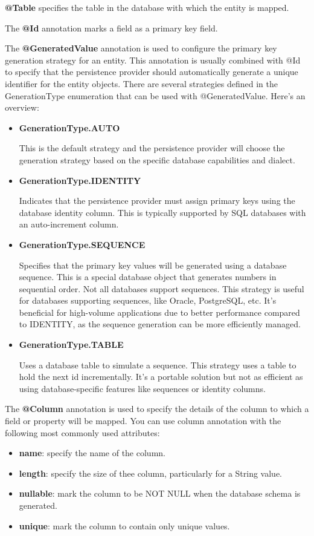 \textbf{@Table} specifies the table in the database with which the entity is mapped.

The \textbf{@Id} annotation marks a field as a primary key field.

The \textbf{@GeneratedValue} annotation is used to configure the primary key generation strategy for an entity. This annotation is usually combined with @Id to specify that the persistence provider should automatically generate a unique identifier for the entity objects. There are several strategies defined in the GenerationType enumeration that can be used with @GeneratedValue. Here's an overview:

\begin{itemize}
\item \textbf{GenerationType.AUTO}

This is the default strategy and the persistence provider will choose the generation strategy based on the specific database capabilities and dialect. 

\item \textbf{GenerationType.IDENTITY}

Indicates that the persistence provider must assign primary keys using the database identity column. This is typically supported by SQL databases with an auto-increment column.

\item \textbf{GenerationType.SEQUENCE}

Specifies that the primary key values will be generated using a database sequence. This is a special database object that generates numbers in sequential order. Not all databases support sequences.
This strategy is useful for databases supporting sequences, like Oracle, PostgreSQL, etc. It's beneficial for high-volume applications due to better performance compared to IDENTITY, as the sequence generation can be more efficiently managed.

\item \textbf{GenerationType.TABLE}

Uses a database table to simulate a sequence. This strategy uses a table to hold the next id incrementally. It's a portable solution but not as efficient as using database-specific features like sequences or identity columns.
\end{itemize}

The \textbf{@Column} annotation is used to specify the details of the column to which a field or property will be mapped. You can use column annotation with the following most commonly used attributes:
\begin{itemize}
\item \textbf{name}: specify the name of the column.
\item \textbf{length}: specify the size of thee column, particularly for a String value.
\item \textbf{nullable}: mark the column to be NOT NULL when the database schema is generated.
\item \textbf{unique}: mark the column to contain only unique values.
\end{itemize}


